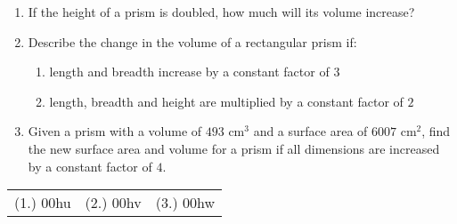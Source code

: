 \begin{exercises}{}{
\begin{enumerate}[noitemsep, label=\textbf{\arabic*}. ] 
 \item If the height of a prism is doubled, how much will its volume increase?
\item Describe the change in the volume of a rectangular prism if:
\begin{enumerate}[noitemsep, label=\textbf{(\alph*)} ] 
\item length and breadth increase by a constant factor of $3$
\item length, breadth and height are multiplied by a constant factor of $2$
\end{enumerate}
\item Given a prism with a volume of $493$ cm$^{3}$ and a surface area of $6007$ cm$^{2}$, 
find the new surface area and volume for a prism if all dimensions are increased by a constant factor of $4$. 
\end{enumerate}
\practiceinfo

\begin{tabularx}{\textwidth}{ XX }
(1.) 00hu&	(2.) 00hv& (3.) 00hw\end{tabularx}
}
\end{exercises}

